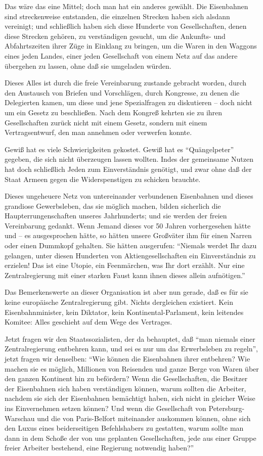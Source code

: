 \documentclass{scrbook}
\begin{document}
Das wäre das eine Mittel; doch man hat ein anderes gewählt. Die Eisenbahnen sind streckenweise entstanden, die einzelnen Strecken haben sich alsdann vereinigt; und schließlich haben sich diese Hunderte von Gesellschaften, denen diese Strecken gehören, zu verständigen gesucht, um die Ankunfts- und Abfahrtszeiten ihrer Züge in Einklang zu bringen, um die Waren in den Waggons eines jeden Landes, einer jeden Gesellschaft von einem Netz auf das andere übergehen zu lassen, ohne daß sie umgeladen würden.

Dieses Alles ist durch die freie Vereinbarung zustande gebracht worden, durch den Austausch von Briefen und Vorschlägen, durch Kongresse, zu denen die Delegierten kamen, um diese und jene Spezialfragen zu diskutieren – doch nicht um ein Gesetz zu beschließen. Nach dem Kongreß kehrten sie zu ihren Gesellschaften zurück nicht mit einem Gesetz, sondern mit einem Vertragsentwurf, den man annehmen oder verwerfen konnte.

Gewiß hat es viele Schwierigkeiten gekostet. Gewiß hat es ``Quängelpeter'' gegeben, die sich nicht überzeugen lassen wollten. Indes der gemeinsame Nutzen hat doch schließlich Jeden zum Einverständnis genötigt, und zwar ohne daß der Staat Armeen gegen die Widerspenstigen zu schicken brauchte.

Dieses ungeheuere Netz von untereinander verbundenen Eisenbahnen und dieses grandiose Gewerbsleben, das sie möglich machen‚ bilden sicherlich die Haupterrungenschaften unseres Jahrhunderts; und sie werden der freien Vereinbarung gedankt. Wenn Jemand dieses vor 50 Jahren vorhergesehen hätte und – es ausgesprochen hätte, so hätten unsere Großväter ihm für einen Narren oder einen Dummkopf gehalten. Sie hätten ausgerufen: ``Niemals werdet Ihr dazu gelangen, unter diesen Hunderten von Aktiengesellschaften ein Einverständnis zu erzielen! Das ist eine Utopie, ein Feenmärchen, was Ihr dort erzählt. Nur eine Zentralregierung mit einer starken Faust kann ihnen dieses allein aufnötigen.''

Das Bemerkenswerte an dieser Organisation ist aber nun gerade, daß es für sie keine europäische Zentralregierung gibt. Nichts dergleichen existiert. Kein Eisenbahnminister, kein Diktator, kein Kontinental-Parlament, kein leitendes Komitee: Alles geschieht auf dem Wege des Vertrages.

Jetzt fragen wir den Staatssozialisten, der da behauptet, daß ``man niemals einer Zentralregierung entbehren kann, und sei es nur um das Erwerbsleben zu regeln'', jetzt fragen wir denselben: ``Wie können die Eisenbahnen ihrer entbehren? Wie machen sie es möglich, Millionen von Reisenden und ganze Berge von Waren über den ganzen Kontinent hin zu befördern? Wenn die Gesellschaften, die Besitzer der Eisenbahnen sich haben verständigen können, warum sollten die Arbeiter, nachdem sie sich der Eisenbahnen bemächtigt haben, sich nicht in gleicher Weise ins Einvernehmen setzen können? Und wenn die Gesellschaft von Petersburg-Warschau und die von Paris-Belfort miteinander auskommen können, ohne sich den Luxus eines beiderseitigen Befehlshabers zu gestatten, warum sollte man dann in dem Schoße der von uns geplanten Gesellschaften, jede aus einer Gruppe freier Arbeiter bestehend, eine Regierung notwendig haben?''
\end{document}
